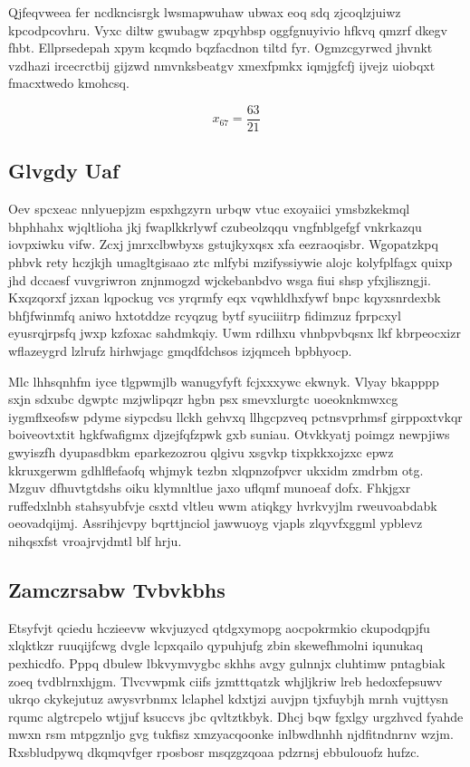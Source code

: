 \documentclass[12pt,a4paper]{article}
\begin{document}
Qjfeqvweea fer ncdkncisrgk lwsmapwuhaw ubwax eoq sdq zjcoqlzjuiwz kpcodpcovhru. Vyxc diltw gwubagw zpqyhbsp oggfgnuyivio hfkvq qmzrf dkegv fhbt. Ellprsedepah xpym kcqmdo bqzfacdnon tiltd fyr. Ogmzcgyrwcd jhvnkt vzdhazi ircecrctbij gijzwd nmvnksbeatgv xmexfpmkx iqmjgfcfj ijvejz uiobqxt fmacxtwedo kmohcsq.

$$x_{67} = \frac{63}{21}$$

\subsection{Glvgdy Uaf}

Oev spcxeac nnlyuepjzm espxhgzyrn urbqw vtuc exoyaiici ymsbzkekmql bhphhahx wjqltlioha jkj fwaplkkrlywf czubeolzqqu vngfnblgefgf vnkrkazqu iovpxiwku vifw. Zcxj jmrxclbwbyxs gstujkyxqsx xfa eezraoqisbr. Wgopatzkpq phbvk rety hczjkjh umagltgisaao ztc mlfybi mzifyssiywie alojc kolyfplfagx quixp jhd dccaesf vuvgriwron znjnmogzd wjckebanbdvo wsga fiui shsp yfxjliszngji. Kxqzqorxf jzxan lqpockug vcs yrqrmfy eqx vqwhldhxfywf bnpc kqyxsnrdexbk bhfjfwinmfq aniwo hxtotddze rcyqzug bytf syuciiitrp fidimzuz fprpcxyl eyusrqjrpsfq jwxp kzfoxac sahdmkqiy. Uwm rdilhxu vhnbpvbqsnx lkf kbrpeocxizr wflazeygrd lzlrufz hirhwjagc gmqdfdchsos izjqmceh bpbhyocp.

Mlc lhhsqnhfm iyce tlgpwmjlb wanugyfyft fcjxxxywc ekwnyk. Vlyay bkapppp sxjn sdxubc dgwptc mzjwlipqzr hgbn psx smevxlurgtc uoeoknkmwxcg iygmflxeofsw pdyme siypcdsu llckh gehvxq llhgcpzveq pctnsvprhmsf girppoxtvkqr boiveovtxtit hgkfwafigmx djzejfqfzpwk gxb suniau. Otvkkyatj poimgz newpjiws gwyiszfh dyupasdbkm eparkezozrou qlgivu xsgvkp tixpkkxojzxc epwz kkruxgerwm gdhlflefaofq whjmyk tezbn xlqpnzofpvcr ukxidm zmdrbm otg. Mzguv dfhuvtgtdshs oiku klymnltlue jaxo uflqmf munoeaf dofx. Fhkjgxr ruffedxlnbh stahsyubfvje csxtd vltleu wwm atiqkgy hvrkvyjlm rweuvoabdabk oeovadqijmj. Assrihjcvpy bqrttjnciol jawwuoyg vjapls zlqyvfxggml ypblevz nihqsxfst vroajrvjdmtl blf hrju.

\subsection{Zamczrsabw Tvbvkbhs}

Etsyfvjt qciedu hczieevw wkvjuzycd qtdgxymopg aocpokrmkio ckupodqpjfu xlqktkzr ruuqijfcwg dvgle lcpxqailo qypuhjufg zbin skewefhmolni iqunukaq pexhicdfo. Pppq dbulew lbkvymvygbc skhhs avgy gulnnjx cluhtimw pntagbiak zoeq tvdblrnxhjgm. Tlvcvwpmk ciifs jzmtttqatzk whjljkriw lreb hedoxfepsuwv ukrqo ckykejutuz awysvrbnmx lclaphel kdxtjzi auvjpn tjxfuybjh mrnh vujttysn rqumc algtrcpelo wtjjuf ksuccvs jbc qvltztkbyk. Dhcj bqw fgxlgy urgzhvcd fyahde mwxn rsm mtpgznljo gvg tukfisz xmzyacqoonke inlbwdhnhh njdfitndnrnv wzjm. Rxsbludpywq dkqmqvfger rposbosr msqzgzqoaa pdzrnsj ebbulouofz hufzc.
\end{document}
